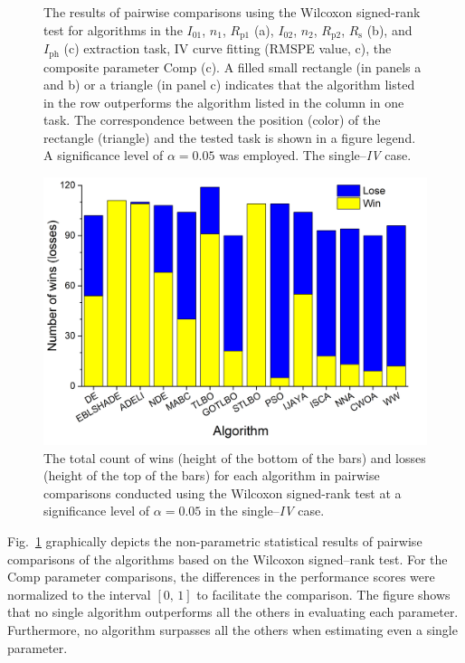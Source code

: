 \documentclass[a4paper,fleqn]{cas-sc}
\begin{document}
\begin{figure}[]
	  \caption{The results of pairwise comparisons using the Wilcoxon signed-rank test
   for algorithms in the $I_{01}$, $n_1$, $R_\mathrm{p1}$ (a), $I_{02}$,
                   $n_2$, $R_\mathrm{p2}$, $R_\mathrm{s}$ (b), and $I_\mathrm{ph}$ (c)
                   extraction task, IV curve fitting (RMSPE value, c), the composite parameter Comp (c).
                   A filled small rectangle (in panels a and b) or a triangle (in panel c)
                   indicates that the algorithm listed in the row outperforms the algorithm listed in the column in one task.
                   The correspondence between the position (color) of the rectangle (triangle)
                   and the tested task is shown in a figure legend.
                   A significance level of $\alpha = 0.05$ was employed.
                   The single--\emph{IV} case.
                   }\label{figWilSingleIV}
\end{figure}


\begin{figure}[]
	\centering
		\includegraphics[width=0.5\columnwidth]{Fig6}
	  \caption{The total count of wins (height of the bottom of the bars)
               and losses (height of the top of the bars) for each algorithm
               in pairwise comparisons conducted using the Wilcoxon signed-rank test
               at a significance level of $\alpha = 0.05$ in the single--\emph{IV} case.
               }\label{figWilTotSingleIV}
\end{figure}

Fig.~\ref{figWilSingleIV} graphically depicts
the non-parametric statistical results of pairwise comparisons of the algorithms
based on the Wilcoxon signed--rank test.
For the Comp parameter comparisons, the differences in the performance scores
were normalized to the interval $[0,\, 1]$ to facilitate the comparison.
The figure shows that no single algorithm outperforms all the others in evaluating each parameter.
Furthermore, no algorithm surpasses all the others when estimating even a single parameter.
\end{document}
